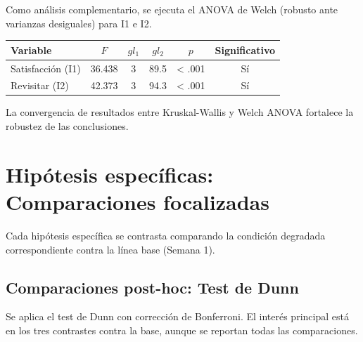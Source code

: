 \documentclass[
  spanish,
]{article}
\begin{document}
Como análisis complementario, se ejecuta el ANOVA de Welch (robusto ante
varianzas desiguales) para I1 e I2.

\begin{table}[!h]
\centering
\begin{tabular}{lccccc}
\toprule
Variable & $F$ & $gl_1$ & $gl_2$ & $p$ & Significativo\\
\midrule
Satisfacción (I1) & 36.438 & 3 & 89.5 & < .001 & Sí\\
Revisitar (I2) & 42.373 & 3 & 94.3 & < .001 & Sí\\
\bottomrule
\end{tabular}
\end{table}

La convergencia de resultados entre Kruskal-Wallis y Welch ANOVA
fortalece la robustez de las conclusiones.

\newpage

\section{Hipótesis específicas: Comparaciones
focalizadas}\label{hipuxf3tesis-especuxedficas-comparaciones-focalizadas}

Cada hipótesis específica se contrasta comparando la condición degradada
correspondiente contra la línea base (Semana 1).

\subsection{Comparaciones post-hoc: Test de
Dunn}\label{comparaciones-post-hoc-test-de-dunn}

Se aplica el test de Dunn con corrección de Bonferroni. El interés
principal está en los tres contrastes contra la base, aunque se reportan
todas las comparaciones.
\end{document}

